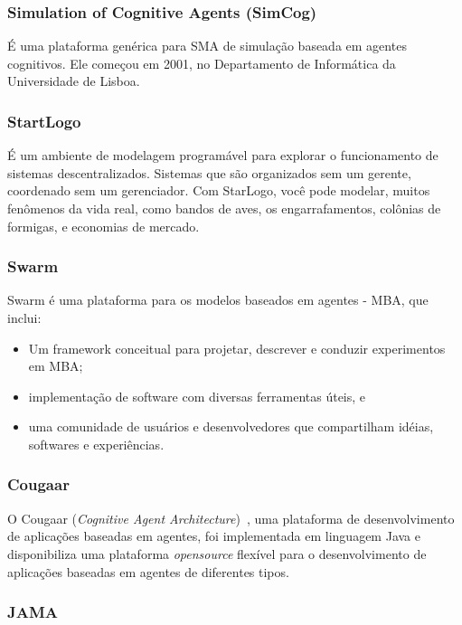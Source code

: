 \subsubsection*{Simulation of Cognitive Agents (SimCog)}

É uma plataforma genérica para SMA de simulação baseada em agentes cognitivos. Ele começou em 2001, no Departamento de Informática da Universidade de Lisboa.

\subsubsection*{StartLogo}

É um ambiente de modelagem programável para explorar o funcionamento de sistemas descentralizados. Sistemas que são organizados sem um gerente, coordenado sem um gerenciador. Com StarLogo, você pode modelar, muitos fenômenos da vida real, como bandos de aves, os engarrafamentos, colônias de formigas, e economias de mercado.

\subsubsection*{Swarm} 

Swarm é uma plataforma para os modelos baseados em agentes - MBA, que inclui:

\begin{itemize}
\item Um framework conceitual para projetar, descrever e conduzir experimentos em MBA;
\item implementação de software com diversas ferramentas úteis, e 
\item uma comunidade de usuários e desenvolvedores que compartilham idéias, softwares e experiências.
\end{itemize}

\subsubsection*{Cougaar}

O Cougaar (\textit{Cognitive Agent Architecture})~\citep{Cougar:2011}, uma plataforma de desenvolvimento de aplicações baseadas em agentes, foi implementada em linguagem Java e disponibiliza uma plataforma \textit{opensource} flexível para o desenvolvimento de aplicações baseadas em agentes de diferentes tipos.

\subsubsection*{JAMA}

